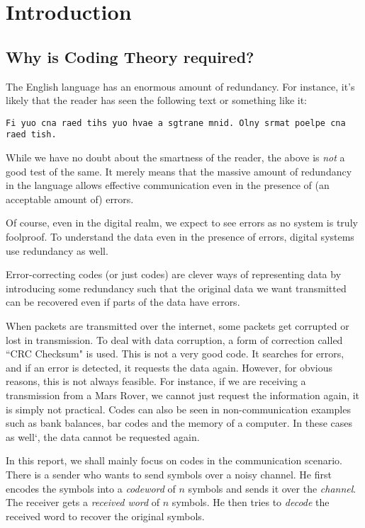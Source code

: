 \section{Introduction}

\subsection{Why is Coding Theory required?}
The English language has an enormous amount of redundancy. For instance, it's likely that the reader has seen the following text or something like it:

\vspace{1mm}
\texttt{Fi yuo cna raed tihs yuo hvae a sgtrane mnid. Olny srmat poelpe cna raed tish.}

\vspace{1mm}
While we have no doubt about the smartness of the reader, the above is \textit{not} a good test of the same. It merely means that the massive amount of redundancy in the language allows effective communication even in the presence of (an acceptable amount of) errors.

Of course, even in the digital realm, we expect to see errors as no system is truly foolproof. To understand the data even in the presence of errors, digital systems use redundancy as well.

\vspace{2mm}
Error-correcting codes (or just codes) are clever ways of representing data by introducing some redundancy such that the original data we want transmitted can be recovered even if parts of the data have errors.

When packets are transmitted over the internet, some packets get corrupted or lost in transmission. To deal with data corruption, a form of correction called ``CRC Checksum" is used. This is not a very good code. It searches for errors, and if an error is detected, it requests the data again. However, for obvious reasons, this is not always feasible. For instance, if we are receiving a transmission from a Mars Rover, we cannot just request the information again, it is simply not practical. Codes can also be seen in non-communication examples such as bank balances, bar codes and the memory of a computer. In these cases as well`, the data cannot be requested again.

\vspace{2mm}
In this report, we shall mainly focus on codes in the communication scenario. There is a sender who wants to send symbols over a noisy channel. He first encodes the symbols into a \textit{codeword} of $n$ symbols and sends it over the \textit{channel}. The receiver gets a \textit{received word} of $n$ symbols. He then tries to \textit{decode} the received word to recover the original symbols.

